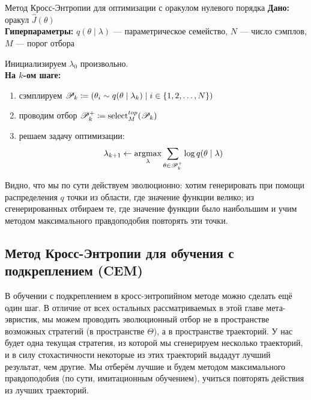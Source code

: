 \begin{algorithm}{Метод Кросс-Энтропии для оптимизации с оракулом нулевого порядка}
\textbf{Дано:} оракул $\hat{J}(\theta)$ \\
\textbf{Гиперпараметры:} $q(\theta \mid \lambda)$ --- параметрическое семейство, $N$ --- число сэмплов, $M$ --- порог отбора

\vspace{0.3cm}
Инициализируем $\lambda_0$ произвольно. \\
\textbf{На $k$-ом шаге:}
\begin{enumerate}
    \item сэмплируем $\mathscr{P}_k \coloneqq \left( \theta_i \sim q(\theta \mid \lambda_k) \mid i \in \{1, 2, \dots, N\} \right)$
    \item проводим отбор $\mathscr{P}^{+}_k \coloneqq \mathrm{select}^{\mathop{top}}_M(\mathscr{P}_k)$
    \item решаем задачу оптимизации:
    $$\lambda_{k+1} \leftarrow \mathop{\mathrm{argmax}}_{\lambda} \sum_{\theta \in \mathscr{P}^{+}_k} \log q(\theta \mid \lambda)$$
\end{enumerate}
\end{algorithm}

Видно, что мы по сути действуем эволюционно: хотим генерировать при помощи распределения $q$ точки из области, где значение функции велико; из сгенерированных отбираем те, где значение функции было наибольшим и учим методом максимального правдоподобия повторять эти точки.

\subsection{Метод Кросс-Энтропии для обучения с подкреплением (CEM)}

В обучении с подкреплением в кросс-энтропийном методе можно сделать ещё один шаг. В отличие от всех остальных рассматриваемых в этой главе мета-эвристик, мы можем проводить эволюционный отбор не в пространстве возможных стратегий (в пространстве $\Theta$), а в пространстве траекторий. У нас будет одна текущая стратегия, из которой мы сгенерируем несколько траекторий, и в силу стохастичности некоторые из этих траекторий выдадут лучший результат, чем другие. Мы отберём лучшие и будем методом максимального правдоподобия (по сути, имитационным обучением), учиться повторять действия из лучших траекторий.  

